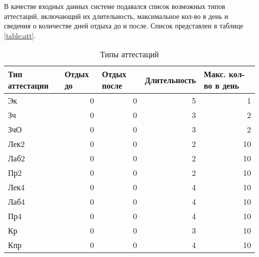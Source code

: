 В качестве входных данных системе подавался список возможных типов аттестаций, включающий их длительность, максимальное кол-во в день и сведения о количестве дней отдыха до и после. Список представлен в таблице \ref{table:att}.
\begin{table}[htbp]
	\centering\small 
	\caption{Типы аттестаций}%
	\begin{tabular}{|l|r|r|r|r|}
		\hline
		Тип аттестации & \multicolumn{1}{l|}{Отдых до} & \multicolumn{1}{l|}{Отдых после} & \multicolumn{1}{l|}{Длительность} & \multicolumn{1}{l|}{Макс. кол-во в день} \\ \hline
		Эк             & 0                             & 0                                & 5                                 & 1                                        \\ \hline
		Зч             & 0                             & 0                                & 3                                 & 2                                        \\ \hline
		ЗчО            & 0                             & 0                                & 3                                 & 2                                        \\ \hline
		Лек2           & 0                             & 0                                & 2                                 & 10                                       \\ \hline
		Лаб2           & 0                             & 0                                & 2                                 & 10                                       \\ \hline
		Пр2            & 0                             & 0                                & 2                                 & 10                                       \\ \hline
		Лек4           & 0                             & 0                                & 4                                 & 10                                       \\ \hline
		Лаб4           & 0                             & 0                                & 4                                 & 10                                       \\ \hline
		Пр4            & 0                             & 0                                & 4                                 & 10                                       \\ \hline
		Кр             & 0                             & 0                                & 3                                 & 10                                       \\ \hline
		Кпр            & 0                             & 0                                & 4                                 & 10                                       \\ \hline
	\end{tabular}
\end{table} \label{table:att}
\FloatBarrier

